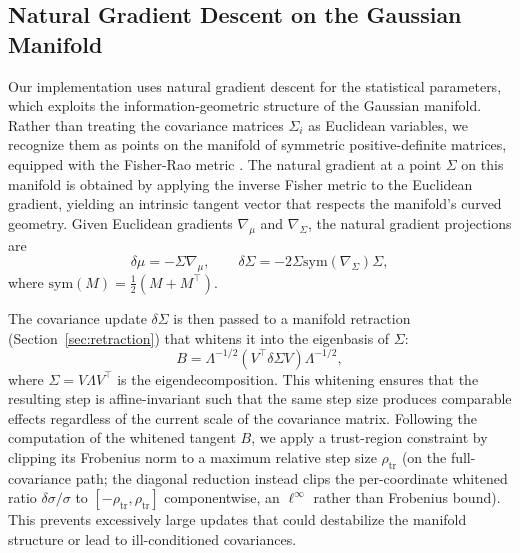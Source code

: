 \documentclass[twoside,11pt]{article}
\begin{document}
\subsection{Natural Gradient Descent on the Gaussian Manifold}
Our implementation uses natural gradient descent for the statistical parameters, which exploits the information-geometric structure of the Gaussian manifold. Rather than treating the covariance matrices $\Sigma_i$ as Euclidean variables, we recognize them as points on the manifold of symmetric positive-definite matrices, equipped with the Fisher-Rao metric \citep{amari1998natural,Cencov1982,Amari2016}. The natural gradient at a point $\Sigma$ on this manifold is obtained by applying the inverse Fisher metric to the Euclidean gradient, yielding an intrinsic tangent vector that respects the manifold's curved geometry. Given Euclidean gradients $\nabla_\mu$ and $\nabla_\Sigma$, the natural gradient projections are
\begin{equation}
\delta\mu = -\Sigma \nabla_\mu, \qquad
\delta\Sigma = -2 \Sigma \mathrm{sym}(\nabla_\Sigma) \Sigma,
\end{equation}
where $\mathrm{sym}(M) = \tfrac{1}{2}(M + M^\top)$.

The covariance update $\delta\Sigma$ is then passed to a manifold retraction (Section~\ref{sec:retraction}) that whitens it into the eigenbasis of $\Sigma$:
\begin{equation}
B = \Lambda^{-1/2} (V^\top \delta\Sigma V) \Lambda^{-1/2},
\end{equation}
where $\Sigma = V \Lambda V^\top$ is the eigendecomposition. This whitening ensures that the resulting step is affine-invariant such that the same step size produces comparable effects regardless of the current scale of the covariance matrix. Following the computation of the whitened tangent $B$, we apply a trust-region constraint by clipping its Frobenius norm to a maximum relative step size $\rho_{\mathrm{tr}}$ (on the full-covariance path; the diagonal reduction instead clips the per-coordinate whitened ratio $\delta\sigma/\sigma$ to $[-\rho_{\mathrm{tr}}, \rho_{\mathrm{tr}}]$ componentwise, an $\ell^{\infty}$ rather than Frobenius bound). This prevents excessively large updates that could destabilize the manifold structure or lead to ill-conditioned covariances.
\end{document}
